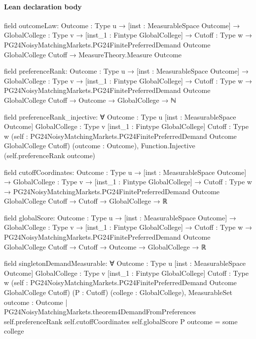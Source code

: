 \documentclass[10pt]{article}
\begin{document}
\paragraph{Lean declaration body}
\begin{ReviewVerbatim}
field outcomeLaw:
{Outcome : Type u} →
  [inst : MeasurableSpace Outcome] →
    {GlobalCollege : Type v} →
      [inst_1 : Fintype GlobalCollege] →
        {Cutoff : Type w} →
          PG24NoisyMatchingMarkets.PG24FinitePreferredDemand Outcome GlobalCollege Cutoff →
            MeasureTheory.Measure Outcome

field preferenceRank:
{Outcome : Type u} →
  [inst : MeasurableSpace Outcome] →
    {GlobalCollege : Type v} →
      [inst_1 : Fintype GlobalCollege] →
        {Cutoff : Type w} →
          PG24NoisyMatchingMarkets.PG24FinitePreferredDemand Outcome GlobalCollege Cutoff → Outcome → GlobalCollege → ℕ

field preferenceRank_injective:
∀ {Outcome : Type u} [inst : MeasurableSpace Outcome] {GlobalCollege : Type v} [inst_1 : Fintype GlobalCollege]
  {Cutoff : Type w} (self : PG24NoisyMatchingMarkets.PG24FinitePreferredDemand Outcome GlobalCollege Cutoff)
  (outcome : Outcome), Function.Injective (self.preferenceRank outcome)

field cutoffCoordinates:
{Outcome : Type u} →
  [inst : MeasurableSpace Outcome] →
    {GlobalCollege : Type v} →
      [inst_1 : Fintype GlobalCollege] →
        {Cutoff : Type w} →
          PG24NoisyMatchingMarkets.PG24FinitePreferredDemand Outcome GlobalCollege Cutoff → Cutoff → GlobalCollege → ℝ

field globalScore:
{Outcome : Type u} →
  [inst : MeasurableSpace Outcome] →
    {GlobalCollege : Type v} →
      [inst_1 : Fintype GlobalCollege] →
        {Cutoff : Type w} →
          PG24NoisyMatchingMarkets.PG24FinitePreferredDemand Outcome GlobalCollege Cutoff →
            Cutoff → Outcome → GlobalCollege → ℝ

field singletonDemandMeasurable:
∀ {Outcome : Type u} [inst : MeasurableSpace Outcome] {GlobalCollege : Type v} [inst_1 : Fintype GlobalCollege]
  {Cutoff : Type w} (self : PG24NoisyMatchingMarkets.PG24FinitePreferredDemand Outcome GlobalCollege Cutoff)
  (P : Cutoff) (college : GlobalCollege),
  MeasurableSet
    {outcome : Outcome |
      PG24NoisyMatchingMarkets.theorem4DemandFromPreferences self.preferenceRank self.cutoffCoordinates self.globalScore
          P outcome =
        some college}
\end{ReviewVerbatim}
\end{document}
